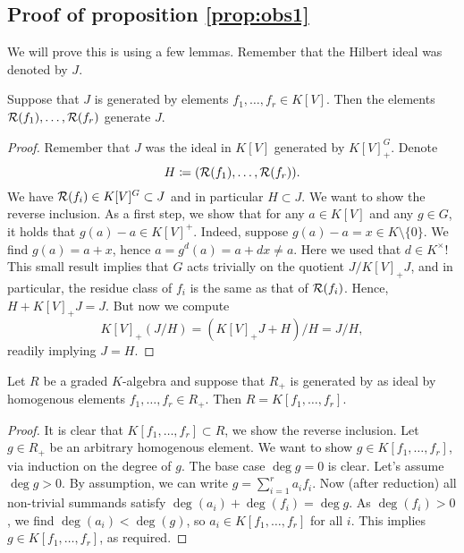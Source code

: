 \documentclass[../main.tex]{subfiles}
\begin{document}
\subsection{Proof of proposition \ref{prop:obs1}} %
\label{sub:Proofs of proposition 8}
We will prove this is using a few lemmas.
Remember that the Hilbert ideal was denoted by $J$.
\begin{lem}\label{lem:8.1}
    Suppose that $J$ is generated by elements $f_1, \dots, f_r \in K[V]$. Then
    the elements
    $\mathcal{R}(f_1), \dots, \mathcal{R}(f_r)$ generate $J$.
\begin{proof}
    Remember that $J$ was the ideal in $K[V]$ generated by $K[V]^G_+$. 
    Denote $$H \coloneqq (\mathcal{R}(f_1), \dots, \mathcal{R}(f_r)).$$ We have $\mathcal{R}(f_i) \in
    K[V]^G\subset J$ and in particular $H \subset J$. We want to show the
    reverse inclusion. As a first step, we show that for any 
    $a \in K[V]$ and any $g \in G$, it holds that $g(a) - a \in K[V]^+$. 
    Indeed, suppose $g(a) - a = x \in K\setminus\{0\}$. We find $g(a) = a + x$, hence
    $a = g^d(a) = a + dx \neq a$. Here we used that $d \in K^\times$! This small
    result implies that $G$ acts trivially on the quotient $J/K[V]_+ J$, and in particular,
    the residue class of $f_i$ is the same as that of $\mathcal{R}(f_i)$. Hence, 
    $H + K[V]_+ J = J$. But now we compute
    \begin{equation*}
        K[V]_+(J/H) = (K[V]_+ J + H)/H = J/H,
    \end{equation*}
    readily implying $J = H$.
\end{proof}

\begin{lem}
    Let $R$ be a graded $K$-algebra and suppose that $R_{+}$ is generated by
    as ideal by homogenous elements $f_1, \dots, f_r \in R_+$. Then $R = K[f_1,
    \dots, f_r]$.
\begin{proof}
    It is clear that $K[f_1, \dots, f_r] \subset R$, we show the reverse inclusion.
    Let $g \in R_+$ be an arbitrary homogenous element. 
    We want to show $g \in K[f_1, \dots, f_r]$, via induction on the degree of $g$.
    The base case $\deg g = 0$ is clear. Let's assume $\deg g > 0$. By assumption,
    we can write $g = \sum_{i=1}^r a_i f_i$. Now (after reduction) all
    non-trivial summands satisfy $\deg(a_i) + \deg(f_i) = \deg g$. As
    $\deg(f_i) > 0$, we find $\deg(a_i) < \deg (g)$, so $a_i \in K[f_1, \dots, f_r]$ 
    for all $i$. This implies $g \in K[f_1, \dots, f_r]$, as required.
\end{proof}
\end{lem}

\end{lem}
\end{document}
